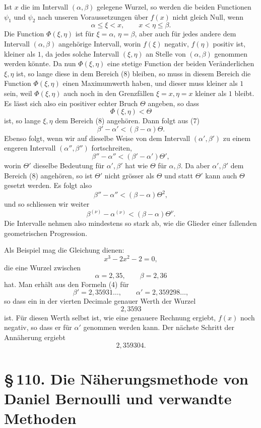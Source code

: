 \documentclass[11pt]{article}
\providecommand{\sect}[2]{\section*{\S\,#1. #2}}
\begin{document}
Ist $x$ die im Intervall $(\alpha,\beta)$ gelegene Wurzel, so werden die beiden Functionen $\psi_1$ und $\psi_2$ nach unseren Voraussetzungen über $f(x)$ nicht gleich Null, wenn
\begin{equation}
        \alpha\le \xi<x,\qquad x<\eta\le\beta.
\tag{8}
\end{equation}
Die Function $\Phi(\xi,\eta)$ ist für $\xi=\alpha$, $\eta=\beta$, aber auch für jedes andere dem Intervall $(\alpha,\beta)$ angehörige Intervall, worin $f(\xi)$ negativ, $f(\eta)$ positiv ist, kleiner als $1$, da jedes solche Intervall $(\xi,\eta)$ an Stelle von $(\alpha,\beta)$ genommen werden könnte. Da nun $\Phi(\xi,\eta)$ eine stetige Function der beiden Veränderlichen $\xi,\eta$ ist, so lange diese in dem Bereich (8) bleiben, so muss in diesem Bereich die Function $\Phi(\xi,\eta)$ einen Maximumwerth haben, und dieser muss kleiner als $1$ sein, weil $\Phi(\xi,\eta)$ auch noch in den Grenzfällen $\xi=x,\eta=x$ kleiner als $1$ bleibt. Es lässt sich also ein positiver echter Bruch $\Theta$ angeben, so dass
\[
        \Phi(\xi,\eta)<\Theta
\]
ist, so lange $\xi,\eta$ dem Bereich (8) angehören. Dann folgt aus (7)
\[
        \beta'-\alpha'<(\beta-\alpha)\Theta.
\]
Ebenso folgt, wenn wir auf dieselbe Weise von dem Intervall $(\alpha',\beta')$ zu einem engeren Intervall $(\alpha'',\beta'')$ fortschreiten,
\[
        \beta''-\alpha''<(\beta'-\alpha')\Theta',
\]
worin $\Theta'$ dieselbe Bedeutung für $\alpha',\beta'$ hat wie $\Theta$ für $\alpha,\beta$. Da aber $\alpha',\beta'$ dem Bereich (8) angehören, so ist $\Theta'$ nicht grösser als $\Theta$ und statt $\Theta'$ kann auch $\Theta$ gesetzt werden. Es folgt also
\[
        \beta''-\alpha''<(\beta-\alpha)\Theta^2,
\]
und so schliessen wir weiter
\[
        \beta^{(\nu)}-\alpha^{(\nu)}<(\beta-\alpha)\Theta^\nu.
\]
Die Intervalle nehmen also mindestens so stark ab, wie die Glieder einer fallenden geometrischen Progression.

Als Beispiel mag die Gleichung dienen:
\[
        x^3-2x^2-2=0,
\]
die eine Wurzel zwischen
\[
        \alpha=2{,}35,\qquad \beta=2{,}36
\]
hat. Man erhält aus den Formeln (4) für
\[
        \beta'=2{,}35931\ldots,\qquad
        \alpha'=2{,}359298\ldots,
\]
so dass ein in der vierten Decimale genauer Werth der Wurzel
\[
        2{,}3593
\]
ist. Für diesen Werth selbst ist, wie eine genauere Rechnung ergiebt, $f(x)$ noch negativ, so dass er für $\alpha'$ genommen werden kann. Der nächste Schritt der Annäherung ergiebt
\[
        2{,}359304.
\]

\sect{110}{Die Näherungsmethode von Daniel Bernoulli und verwandte Methoden}
\end{document}
